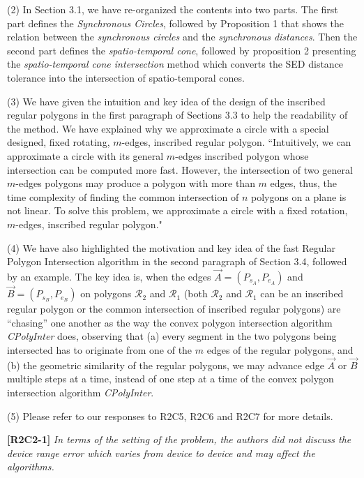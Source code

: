 \documentclass{letter}
\newcommand{\vv}{\overrightarrow}
\begin{document}
(2) In Section 3.1, we have re-organized the contents into two parts. The first part defines the \emph{Synchronous Circles}, followed by Proposition 1 that shows the relation between the \textit{synchronous circles} and the \textit{synchronous distances}. Then the second part defines the \textit{spatio-temporal cone}, followed by proposition 2 presenting the \textit{spatio-temporal cone intersection} method which converts the SED distance tolerance into the intersection of spatio-temporal cones.

(3) We have given the intuition and key idea of the design of the inscribed regular polygons in the first paragraph of Sections 3.3 to help the readability of the method. We have explained why we approximate a circle with a special designed, fixed rotating, $m$-edges, inscribed regular polygon. ``Intuitively, we can approximate a circle with its general $m$-edges inscribed polygon {whose intersection can be computed more fast}. However, the intersection of two general $m$-edges polygons may produce a polygon with more than $m$ edges, thus, the time complexity of finding the common intersection of $n$ polygons on a plane is not linear. To solve this problem, we approximate a circle with a fixed rotation, $m$-edges, inscribed regular polygon."

(4) We have also highlighted the motivation and key idea of the fast Regular Polygon Intersection algorithm in the second paragraph of Section 3.4, followed by an example. The key idea is, when the edges $\vv{A} = (P_{s_A}, P_{e_A})$ and $\vv{B} = (P_{s_B}, P_{e_B})$ on polygons $\mathcal{R}_2$ and $\mathcal{R}_1$ (both $\mathcal{R}_2$ and $\mathcal{R}_1$ can be an inscribed regular polygon or the common intersection of inscribed regular polygons) are ``chasing'' one another as the way the convex polygon intersection algorithm \emph{CPolyInter} does, 
observing that (a) every segment in the two polygons being intersected has to originate from one of the $m$ edges of the regular polygons, and (b) the geometric similarity of the regular polygons, 
we may advance edge $\vv{A}$ or $\vv{B}$ multiple steps at a time, instead of one step at a time of the convex polygon intersection algorithm \emph{CPolyInter}.

(5) Please refer to our responses to R2C5, R2C6 and R2C7 for more details.

\textbf{[R2C2-1]} \emph{In terms of the setting of the problem, the authors did not discuss the device range error which varies from device to device and may affect the algorithms.}
\end{document}
